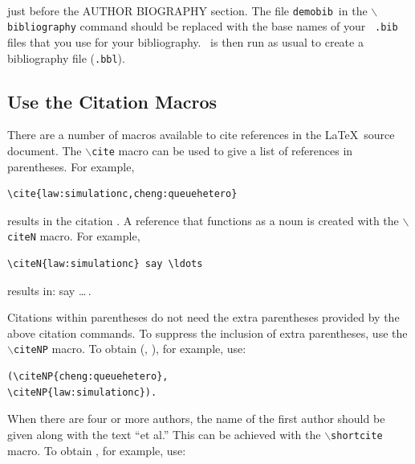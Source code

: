 \documentclass{wscpaperproc}
\theoremstyle{wsc}
\begin{document}
\begin{verbatim}


\end{verbatim}\vspace{5mm}

\noindent just before the AUTHOR BIOGRAPHY section.  The file {\tt demobib}\ in the {\tt $\backslash$bibliography} command should be replaced with the base names of your \BibTeX\ {\tt *.bib} files that you use for your bibliography.  \BibTeX\ is then run as usual to create a bibliography file ({\tt *.bbl}).

\subsection{Use the Citation Macros}
There are a number of macros available to cite references in the \LaTeX\ source document.  The {\tt $\backslash$cite} macro can be used to give a list of references in parentheses.  For example,\newline

\begin{verbatim}
\cite{law:simulationc,cheng:queuehetero}
\end{verbatim}\vspace{5mm}

\noindent results in the citation \cite{law:simulationc,cheng:queuehetero}. A reference that functions as a noun is created with the {\tt $\backslash$citeN}
macro.  For example,\newline


\begin{verbatim}
\citeN{law:simulationc} say \ldots
\end{verbatim}\vspace{5mm}

\noindent results in:  say \ldots\,.

Citations within parentheses do not need the extra parentheses provided by the above citation commands.  To suppress the inclusion of extra parentheses, use the {\tt $\backslash$citeNP} macro.  To obtain (, ), for example, use:\newline


\begin{verbatim}
(\citeNP{cheng:queuehetero},
\citeNP{law:simulationc}).
\end{verbatim}\vspace{5mm}

When there are four or more authors, the name of the first author should be given along with the text ``et al.''  This can be achieved with the {\tt $\backslash$shortcite} macro. To obtain , for example, use: \newline
\end{document}
